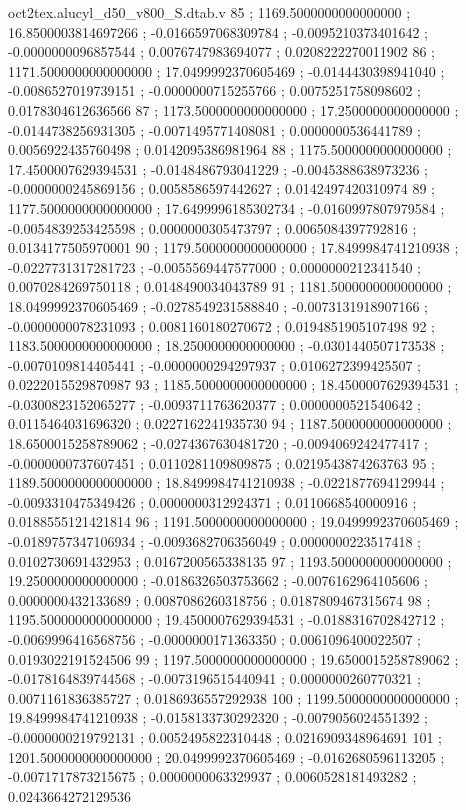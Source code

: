 \begin{filecontents}[overwrite]{oct2tex.alucyl_d50_v800_S.dtab.v}
85 ; 1169.5000000000000000 ; 16.8500003814697266 ; -0.0166597068309784 ; -0.0095210373401642 ; -0.0000000096857544 ; 0.0076747983694077 ; 0.0208222270011902
86 ; 1171.5000000000000000 ; 17.0499992370605469 ; -0.0144430398941040 ; -0.0086527019739151 ; -0.0000000715255766 ; 0.0075251758098602 ; 0.0178304612636566
87 ; 1173.5000000000000000 ; 17.2500000000000000 ; -0.0144738256931305 ; -0.0071495771408081 ; 0.0000000536441789 ; 0.0056922435760498 ; 0.0142095386981964
88 ; 1175.5000000000000000 ; 17.4500007629394531 ; -0.0148486793041229 ; -0.0045388638973236 ; -0.0000000245869156 ; 0.0058586597442627 ; 0.0142497420310974
89 ; 1177.5000000000000000 ; 17.6499996185302734 ; -0.0160997807979584 ; -0.0054839253425598 ; 0.0000000305473797 ; 0.0065084397792816 ; 0.0134177505970001
90 ; 1179.5000000000000000 ; 17.8499984741210938 ; -0.0227731317281723 ; -0.0055569447577000 ; 0.0000000212341540 ; 0.0070284269750118 ; 0.0148490034043789
91 ; 1181.5000000000000000 ; 18.0499992370605469 ; -0.0278549231588840 ; -0.0073131918907166 ; -0.0000000078231093 ; 0.0081160180270672 ; 0.0194851905107498
92 ; 1183.5000000000000000 ; 18.2500000000000000 ; -0.0301440507173538 ; -0.0070109814405441 ; -0.0000000294297937 ; 0.0106272399425507 ; 0.0222015529870987
93 ; 1185.5000000000000000 ; 18.4500007629394531 ; -0.0300823152065277 ; -0.0093711763620377 ; 0.0000000521540642 ; 0.0115464031696320 ; 0.0227162241935730
94 ; 1187.5000000000000000 ; 18.6500015258789062 ; -0.0274367630481720 ; -0.0094069242477417 ; -0.0000000737607451 ; 0.0110281109809875 ; 0.0219543874263763
95 ; 1189.5000000000000000 ; 18.8499984741210938 ; -0.0221877694129944 ; -0.0093310475349426 ; 0.0000000312924371 ; 0.0110668540000916 ; 0.0188555121421814
96 ; 1191.5000000000000000 ; 19.0499992370605469 ; -0.0189757347106934 ; -0.0093682706356049 ; 0.0000000223517418 ; 0.0102730691432953 ; 0.0167200565338135
97 ; 1193.5000000000000000 ; 19.2500000000000000 ; -0.0186326503753662 ; -0.0076162964105606 ; 0.0000000432133689 ; 0.0087086260318756 ; 0.0187809467315674
98 ; 1195.5000000000000000 ; 19.4500007629394531 ; -0.0188316702842712 ; -0.0069996416568756 ; -0.0000000171363350 ; 0.0061096400022507 ; 0.0193022191524506
99 ; 1197.5000000000000000 ; 19.6500015258789062 ; -0.0178164839744568 ; -0.0073196515440941 ; 0.0000000260770321 ; 0.0071161836385727 ; 0.0186936557292938
100 ; 1199.5000000000000000 ; 19.8499984741210938 ; -0.0158133730292320 ; -0.0079056024551392 ; -0.0000000219792131 ; 0.0052495822310448 ; 0.0216909348964691
101 ; 1201.5000000000000000 ; 20.0499992370605469 ; -0.0162680596113205 ; -0.0071717873215675 ; 0.0000000063329937 ; 0.0060528181493282 ; 0.0243664272129536

\end{filecontents}
